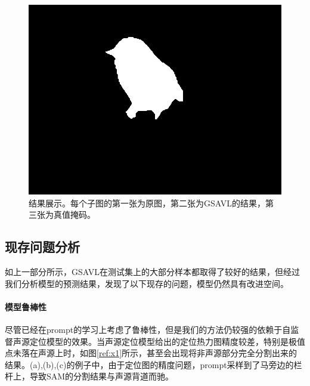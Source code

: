 \documentclass[12pt]{article}
\begin{document}
\begin{figure}[!h]
{\begin{minipage}[t]{0.15\linewidth}
  \includegraphics[width=1\linewidth]{168_gt.png}
  \end{minipage}%
  }%
  \centering
  \caption{结果展示。每个子图的第一张为原图，第二张为GSAVL的结果，第三张为真值掩码。}
  \label{ref:result}
\end{figure}
\subsection{现存问题分析}\label{ques}
如上一部分所示，GSAVL在测试集上的大部分样本都取得了较好的结果，但经过我们分析模型的预测结果，发现了以下现存的问题，模型仍然具有改进空间。

\paragraph{模型鲁棒性}
尽管已经在prompt的学习上考虑了鲁棒性，但是我们的方法仍较强的依赖于自监督声源定位模型的效果。当声源定位模型给出的定位热力图精度较差，特别是极值点未落在声源上时，如图\ref{ref:x1}所示，甚至会出现将非声源部分完全分割出来的结果。(a),(b),(c)的例子中，由于定位图的精度问题，prompt采样到了马旁边的栏杆上，导致SAM的分割结果与声源背道而驰。
\end{document}
